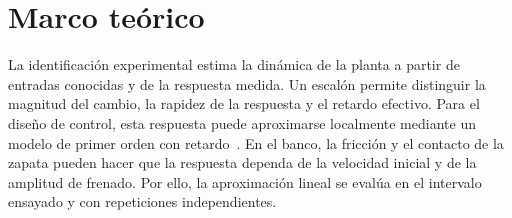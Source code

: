 \section{Marco te\'orico}


La identificaci\'on experimental estima la din\'amica de la planta a
partir de entradas conocidas y de la respuesta medida. Un escal\'on
permite distinguir la magnitud del cambio, la rapidez de la respuesta
y el retardo efectivo. Para el dise\~no de control, esta respuesta puede
aproximarse localmente mediante un modelo de primer orden con
retardo~\cite{skogestad}. En el banco, la fricci\'on y el contacto de la
zapata pueden hacer que la respuesta dependa de la velocidad inicial y
de la amplitud de frenado. Por ello, la aproximaci\'on lineal se eval\'ua
en el intervalo ensayado y con repeticiones independientes.


